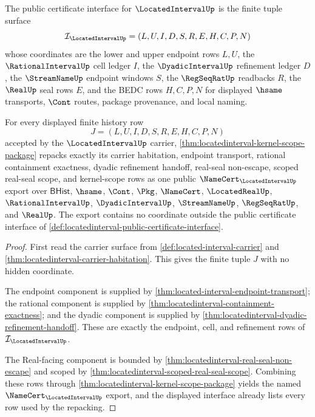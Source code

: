 \begin{definition}
\label{def:locatedinterval-public-certificate-interface}
The public certificate interface for $\LocatedIntervalUp$ is the finite tuple surface
$$
\mathcal{I}_{\LocatedIntervalUp}=(L,U,I,D,S,R,E,H,C,P,N)
$$
whose coordinates are the lower and upper endpoint rows $L,U$, the $\RationalIntervalUp$ cell ledger $I$, the $\DyadicIntervalUp$ refinement ledger $D$, the $\StreamNameUp$ endpoint windows $S$, the $\RegSeqRatUp$ readbacks $R$, the $\RealUp$ seal rows $E$, and the BEDC rows $H,C,P,N$ for displayed $\hsame$ transports, $\Cont$ routes, package provenance, and local naming.
\end{definition}

\begin{theorem}
\label{thm:locatedinterval-public-export-packet}
For every displayed finite history row
$$
J=(L,U,I,D,S,R,E,H,C,P,N)
$$
accepted by the $\LocatedIntervalUp$ carrier, \autoref{thm:locatedinterval-kernel-scope-package} repacks exactly its carrier habitation, endpoint transport, rational containment exactness, dyadic refinement handoff, real-seal non-escape, scoped real-seal scope, and kernel-scope rows as one public $\NameCert_{\LocatedIntervalUp}$ export over $\mathsf{BHist}$, $\hsame$, $\Cont$, $\Pkg$, $\NameCert$, $\LocatedRealUp$, $\RationalIntervalUp$, $\DyadicIntervalUp$, $\StreamNameUp$, $\RegSeqRatUp$, and $\RealUp$. The export contains no coordinate outside the public certificate interface of \autoref{def:locatedinterval-public-certificate-interface}.
\end{theorem}
\begin{proof}
First read the carrier surface from \autoref{def:located-interval-carrier} and \autoref{thm:locatedinterval-carrier-habitation}. This gives the finite tuple $J$ with no hidden coordinate.

The endpoint component is supplied by \autoref{thm:located-interval-endpoint-transport}; the rational component is supplied by \autoref{thm:locatedinterval-containment-exactness}; and the dyadic component is supplied by \autoref{thm:locatedinterval-dyadic-refinement-handoff}. These are exactly the endpoint, cell, and refinement rows of $\mathcal{I}_{\LocatedIntervalUp}$.

The Real-facing component is bounded by \autoref{thm:locatedinterval-real-seal-non-escape} and scoped by \autoref{thm:locatedinterval-scoped-real-seal-scope}. Combining these rows through \autoref{thm:locatedinterval-kernel-scope-package} yields the named $\NameCert_{\LocatedIntervalUp}$ export, and the displayed interface already lists every row used by the repacking.
\end{proof}

